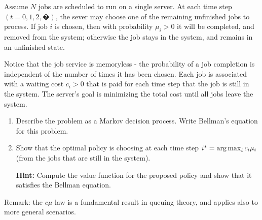 \begin{exercise}\label{ex:c_mu}
Assume $N$ jobs are scheduled to run on a single server. At each time step $(t=0,1,2,�)$, the sever may choose one of the remaining unfinished jobs to process. If job $i$ is chosen, then with probability ${\mu _i} > 0$ it will be completed, and removed from the system; otherwise the job stays in the system, and remains in an unfinished state.

Notice that the job service is memoryless - the probability of a job completion is independent of the number of times it has been chosen.
Each job is associated with a waiting cost ${c_i} > 0$ that is paid for each time step that the job is still in the system. The server's goal is minimizing the total cost until all jobs leave the system.
\begin{enumerate}
  \item Describe the problem as a Markov decision process. Write Bellman's equation for this problem.
  \item Show that the optimal policy is choosing at each time step ${i^*} = \argmax_i {c_i}{\mu _i}$ (from the jobs that are still in the system).

  \textbf{Hint: }Compute the value function for the proposed policy and show that it satisfies the Bellman equation.
\end{enumerate}
Remark: the $c\mu $ law is a fundamental result in queuing theory, and applies also to more general scenarios.
\end{exercise}

